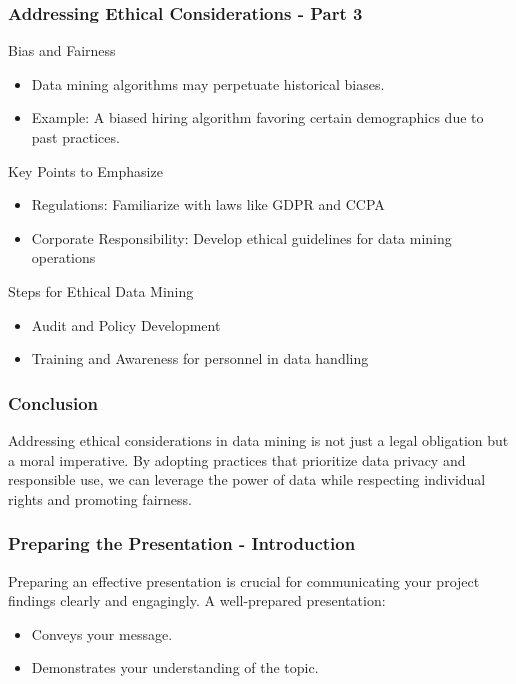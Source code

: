 \documentclass{beamer}
\begin{document}
\begin{frame}[fragile]
    \frametitle{Addressing Ethical Considerations - Part 3}
    \begin{block}{Bias and Fairness}
        \begin{itemize}
            \item Data mining algorithms may perpetuate historical biases.
            \item Example: A biased hiring algorithm favoring certain demographics due to past practices.
        \end{itemize}
    \end{block}

    \begin{block}{Key Points to Emphasize}
        \begin{itemize}
            \item Regulations: Familiarize with laws like GDPR and CCPA
            \item Corporate Responsibility: Develop ethical guidelines for data mining operations
        \end{itemize}
    \end{block}

    \begin{block}{Steps for Ethical Data Mining}
        \begin{itemize}
            \item Audit and Policy Development
            \item Training and Awareness for personnel in data handling
        \end{itemize}
    \end{block}
\end{frame}

\begin{frame}[fragile]
    \frametitle{Conclusion}
    Addressing ethical considerations in data mining is not just a legal obligation but a moral imperative. By adopting practices that prioritize data privacy and responsible use, we can leverage the power of data while respecting individual rights and promoting fairness.
\end{frame}

\begin{frame}[fragile]
    \frametitle{Preparing the Presentation - Introduction}
    Preparing an effective presentation is crucial for communicating your project findings clearly and engagingly. A well-prepared presentation:
    \begin{itemize}
        \item Conveys your message.
        \item Demonstrates your understanding of the topic.
    \end{itemize}
\end{frame}
\end{document}
